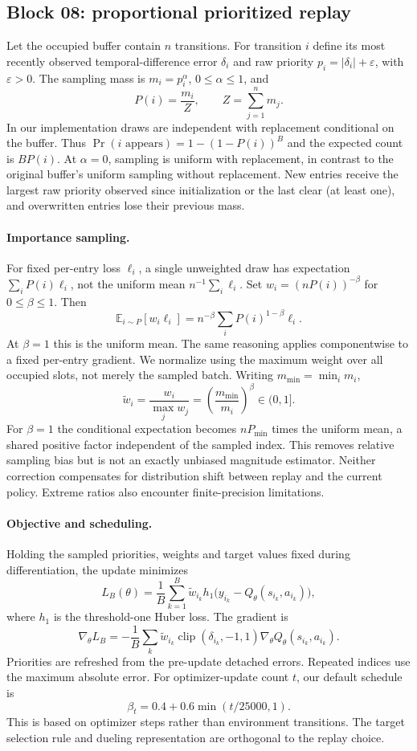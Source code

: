 \documentclass[11pt,a4paper]{article}
\newcommand{\E}{\mathbb E}
\begin{document}
\subsection{Block 08: proportional prioritized replay}
Let the occupied buffer contain $n$ transitions. For transition $i$ define
its most recently observed temporal-difference error $\delta_i$ and raw
priority $p_i=|\delta_i|+\varepsilon$, with $\varepsilon>0$. The sampling mass
is $m_i=p_i^\alpha$, $0\leq\alpha\leq1$, and
\[
 P(i)=\frac{m_i}{Z},\qquad Z=\sum_{j=1}^{n}m_j.
\]
In our implementation draws are independent with replacement conditional on the
buffer. Thus $\Pr(i\text{ appears})=1-(1-P(i))^B$ and the expected count is
$BP(i)$. At $\alpha=0$, sampling is uniform with replacement, in contrast to
the original buffer's uniform sampling without replacement. New entries receive
the largest raw priority observed since initialization or the last clear (at
least one), and overwritten entries lose their previous mass.

\paragraph{Importance sampling.} For fixed per-entry loss $\ell_i$, a single
unweighted draw has expectation $\sum_iP(i)\ell_i$, not the uniform mean
$n^{-1}\sum_i\ell_i$. Set $w_i=(nP(i))^{-\beta}$ for $0\leq\beta\leq1$.
Then
\[
 \E_{i\sim P}[w_i\ell_i]=n^{-\beta}\sum_iP(i)^{1-\beta}\ell_i.
\]
At $\beta=1$ this is the uniform mean. The same reasoning applies componentwise
to a fixed per-entry gradient. We normalize using the maximum weight over all
occupied slots, not merely the sampled batch. Writing $m_{\min}=\min_i m_i$,
\[
 \widetilde w_i=\frac{w_i}{\max_j w_j}
 =\left(\frac{m_{\min}}{m_i}\right)^\beta\in(0,1].
\]
For $\beta=1$ the conditional expectation becomes $nP_{\min}$ times the uniform
mean, a shared positive factor independent of the sampled index. This removes
relative sampling bias but is not an exactly unbiased magnitude estimator.
Neither correction compensates for distribution shift between replay and the
current policy. Extreme ratios also encounter finite-precision limitations.

\paragraph{Objective and scheduling.} Holding the sampled priorities, weights
and target values fixed during differentiation, the update minimizes
\[
 L_B(\theta)=\frac1B\sum_{k=1}^B\widetilde w_{i_k}
 h_1\bigl(y_{i_k}-Q_\theta(s_{i_k},a_{i_k})\bigr),
\]
where $h_1$ is the threshold-one Huber loss. The gradient is
\[
 \nabla_\theta L_B=-\frac1B\sum_k\widetilde w_{i_k}
 \operatorname{clip}(\delta_{i_k},-1,1)
 \nabla_\theta Q_\theta(s_{i_k},a_{i_k}).
\]
Priorities are refreshed from the
pre-update detached errors. Repeated indices use the maximum absolute error.
For optimizer-update count $t$, our default schedule is
\[
 \beta_t=0.4+0.6\min(t/25000,1).
\]
This is based on optimizer steps rather than environment transitions. The target
selection rule and dueling representation are orthogonal to the replay choice.
\end{document}
